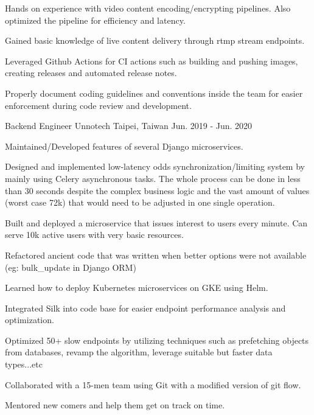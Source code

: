 \begin{cventries}
{\begin{cvitems}
        \item {Hands on experience with video content encoding/encrypting pipelines. Also optimized the pipeline for efficiency and latency. }
        \item {Gained basic knowledge of live content delivery through rtmp stream endpoints.}
        \item {Leveraged Github Actions for CI actions such as building and pushing images, creating releases and automated release notes.}
        \item {Properly document coding guidelines and conventions inside the team for easier enforcement during code review and development. }
      \end{cvitems}
    }

  \cventry
    {Backend Engineer} %
    {Unnotech} %
    {Taipei, Taiwan} %
    {Jun. 2019 - Jun. 2020} %
    {
      \begin{cvitems} %
        \item {Maintained/Developed features of several Django microservices. }
        \item {Designed and implemented low-latency odds synchronization/limiting system by mainly using Celery asynchronous tasks. The whole process can be done in less than 30 seconds despite the complex business logic and the vast amount of values (worst case 72k) that would need to be adjusted in one single operation. }
        \item {Built and deployed a microservice that issues interest to users every minute. Can serve 10k active users with very basic resources. }
        \item {Refactored ancient code that was written when better options were not available (eg: bulk\_update in Django ORM)}
        \item {Learned how to deploy Kubernetes microservices on GKE using Helm. }
        \item {Integrated Silk into code base for easier endpoint performance analysis and optimization. }
        \item {Optimized 50+ slow endpoints by utilizing techniques such as prefetching objects from databases, revamp the algorithm, leverage suitable but faster data types...etc }
        \item {Collaborated with a 15-men team using Git with a modified version of git flow. }
        \item {Mentored new comers and help them get on track on time. }
      \end{cvitems}
    }


\end{cventries}
